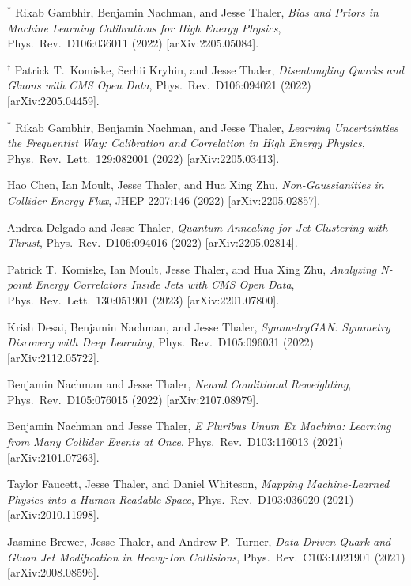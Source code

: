 \begin{list}{[]\addtocounter{jessecount}{-1}}{\leftmargin=3em \itemsep=4pt}
\item
${}^\ast$ Rikab Gambhir, Benjamin Nachman, and Jesse Thaler,
\emph{Bias and Priors in Machine Learning Calibrations for High Energy Physics},
Phys.\ Rev.\ D106:036011 (2022)
[arXiv:2205.05084].

\item
${}^\dagger$ Patrick T.\ Komiske, Serhii Kryhin, and Jesse Thaler,
\emph{Disentangling Quarks and Gluons with CMS Open Data},
Phys.\ Rev.\ D106:094021 (2022)
[arXiv:2205.04459].

\item
${}^\ast$ Rikab Gambhir, Benjamin Nachman, and Jesse Thaler,
\emph{Learning Uncertainties the Frequentist Way: Calibration and Correlation in High Energy Physics},
Phys.\ Rev.\ Lett.\ 129:082001 (2022)
[arXiv:2205.03413].

\item
 Hao Chen, Ian Moult, Jesse Thaler, and Hua Xing Zhu,
\emph{Non-Gaussianities in Collider Energy Flux},
JHEP 2207:146 (2022)
[arXiv:2205.02857].

\item
 Andrea Delgado and Jesse Thaler,
\emph{Quantum Annealing for Jet Clustering with Thrust},
Phys.\ Rev.\ D106:094016 (2022)
[arXiv:2205.02814].

\item
 Patrick T.\ Komiske, Ian Moult, Jesse Thaler, and Hua Xing Zhu,
\emph{Analyzing N-point Energy Correlators Inside Jets with CMS Open Data},
Phys.\ Rev.\ Lett.\ 130:051901 (2023)
[arXiv:2201.07800].

\item
 Krish Desai, Benjamin Nachman, and Jesse Thaler,
\emph{SymmetryGAN: Symmetry Discovery with Deep Learning},
Phys.\ Rev.\ D105:096031 (2022)
[arXiv:2112.05722].

\item
 Benjamin Nachman and Jesse Thaler,
\emph{Neural Conditional Reweighting},
Phys.\ Rev.\ D105:076015 (2022)
[arXiv:2107.08979].

\item
 Benjamin Nachman and Jesse Thaler,
\emph{E Pluribus Unum Ex Machina: Learning from Many Collider Events at Once},
Phys.\ Rev.\ D103:116013 (2021)
[arXiv:2101.07263].

\item
 Taylor Faucett, Jesse Thaler, and Daniel Whiteson,
\emph{Mapping Machine-Learned Physics into a Human-Readable Space},
Phys.\ Rev.\ D103:036020 (2021)
[arXiv:2010.11998].

\item
 Jasmine Brewer, Jesse Thaler, and Andrew P.\ Turner,
\emph{Data-Driven Quark and Gluon Jet Modification in Heavy-Ion Collisions},
Phys.\ Rev.\ C103:L021901 (2021)
[arXiv:2008.08596].


\end{list}
